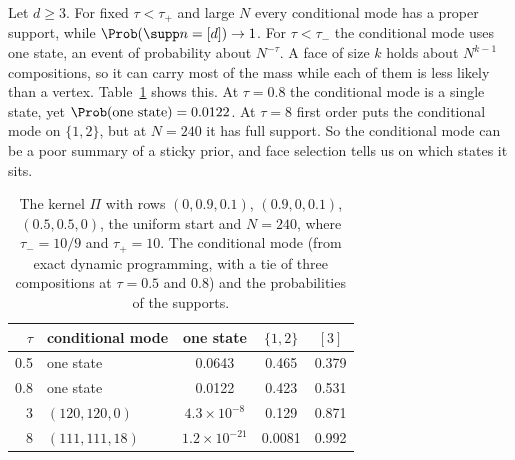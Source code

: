 \begin{remark}\label{rem:mapmass}
Let $d\ge3$. For fixed $\tau<\tau_+$ and large $N$ every conditional mode has a
proper support, while $\Prob(\supp n=[d])\to1$. For $\tau<\tau_-$ the conditional mode uses
one state, an event of probability about $N^{-\tau}$. A face of size $k$ holds
about $N^{k-1}$ compositions, so it can carry most of the mass while each of
them is less likely than a vertex. Table~\ref{tab:sticky} shows this. At
$\tau=0.8$ the conditional mode is a single state, yet $\Prob(\text{one state})=0.0122$. At
$\tau=8$ first
order puts the conditional mode on $\{1,2\}$, but at $N=240$ it has full support. So the
conditional mode can be a poor summary of a sticky prior, and face selection tells us
on which states it sits.
\end{remark}

\begin{table}[t]
\centering\small
\begin{tabular}{@{}rlccc@{}}
\toprule
$\tau$ & conditional mode & one state & $\{1,2\}$ & $[3]$\\
\midrule
0.5 & one state & 0.0643 & 0.465 & 0.379\\
0.8 & one state & 0.0122 & 0.423 & 0.531\\
3 & $(120,120,0)$ & $4.3\times10^{-8}$ & 0.129 & 0.871\\
8 & $(111,111,18)$ & $1.2\times10^{-21}$ & 0.0081 & 0.992\\
\bottomrule
\end{tabular}
\caption{The kernel $\Pi$ with rows $(0,0.9,0.1)$, $(0.9,0,0.1)$,
$(0.5,0.5,0)$, the uniform start and $N=240$, where $\tau_-=10/9$ and
$\tau_+=10$. The conditional mode (from exact dynamic programming, with a tie of
three compositions at $\tau=0.5$ and $0.8$) and the probabilities of the supports.}
\label{tab:sticky}
\end{table}

